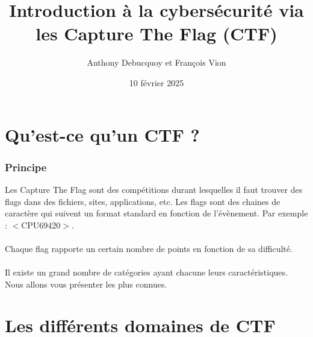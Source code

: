 \documentclass{beamer}
\title[Capture The Flag]{Introduction à la cybersécurité via les Capture The Flag (CTF)} %
\author{Anthony Debucquoy et François Vion} %
\institute[] %
{
Université de Mons \\ %
\medskip
}
\date[]{10 février 2025} %
\begin{document}
\begin{frame}
\titlepage %
\end{frame}

\begin{frame}
\frametitle{} %
\tableofcontents %
\end{frame}



\section{Qu'est-ce qu'un CTF ?} %

\begin{frame}
\frametitle{Principe}

Les Capture The Flag sont des compétitions durant lesquelles il faut trouver des flags dans des fichiers, sites, applications, etc. Les flags sont des chaines de caractère qui suivent un format standard en fonction de l'évènement. Par exemple : $<$CPU69420$>$. \\~\\

Chaque flag rapporte un certain nombre de points en fonction de sa difficulté. \\~\\

Il existe un grand nombre de catégories ayant chacune leurs caractéristiques. Nous allons vous présenter les plus connues.

\end{frame}

\section{Les différents domaines de CTF}
\end{document}
